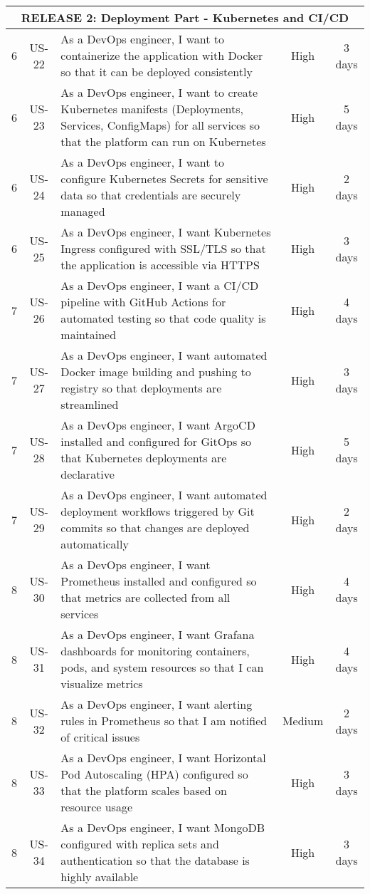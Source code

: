 \begin{longtable}{|c|c|p{8cm}|c|c|}
\multicolumn{5}{|c|}{\cellcolor{green!25}\textbf{RELEASE 2: Deployment Part - Kubernetes and CI/CD}} \\
\hline

6 & US-22 & As a DevOps engineer, I want to containerize the application with Docker so that it can be deployed consistently & High & 3 days \\ \hline
6 & US-23 & As a DevOps engineer, I want to create Kubernetes manifests (Deployments, Services, ConfigMaps) for all services so that the platform can run on Kubernetes & High & 5 days \\ \hline
6 & US-24 & As a DevOps engineer, I want to configure Kubernetes Secrets for sensitive data so that credentials are securely managed & High & 2 days \\ \hline
6 & US-25 & As a DevOps engineer, I want Kubernetes Ingress configured with SSL/TLS so that the application is accessible via HTTPS & High & 3 days \\ \hline

7 & US-26 & As a DevOps engineer, I want a CI/CD pipeline with GitHub Actions for automated testing so that code quality is maintained & High & 4 days \\ \hline
7 & US-27 & As a DevOps engineer, I want automated Docker image building and pushing to registry so that deployments are streamlined & High & 3 days \\ \hline
7 & US-28 & As a DevOps engineer, I want ArgoCD installed and configured for GitOps so that Kubernetes deployments are declarative & High & 5 days \\ \hline
7 & US-29 & As a DevOps engineer, I want automated deployment workflows triggered by Git commits so that changes are deployed automatically & High & 2 days \\ \hline

8 & US-30 & As a DevOps engineer, I want Prometheus installed and configured so that metrics are collected from all services & High & 4 days \\ \hline
8 & US-31 & As a DevOps engineer, I want Grafana dashboards for monitoring containers, pods, and system resources so that I can visualize metrics & High & 4 days \\ \hline
8 & US-32 & As a DevOps engineer, I want alerting rules in Prometheus so that I am notified of critical issues & Medium & 2 days \\ \hline
8 & US-33 & As a DevOps engineer, I want Horizontal Pod Autoscaling (HPA) configured so that the platform scales based on resource usage & High & 3 days \\ \hline
8 & US-34 & As a DevOps engineer, I want MongoDB configured with replica sets and authentication so that the database is highly available & High & 3 days \\ \hline


\end{longtable}
